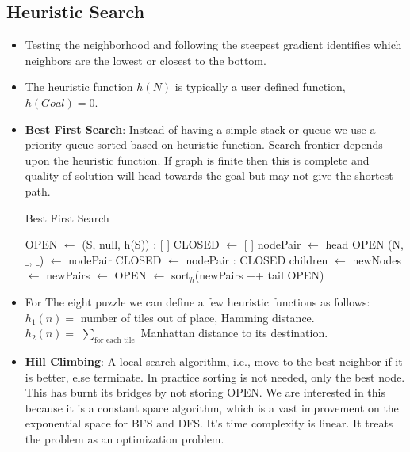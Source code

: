 \documentclass[a4paper]{article}
\begin{document}
\subsection{Heuristic Search}
\begin{itemize}
    \item Testing the neighborhood and following the steepest gradient identifies which neighbors are the lowest or closest to the bottom.
    \item The heuristic function $h(N)$ is typically a user defined function, $h(Goal)=0$.
    \item \textbf{Best First Search}: Instead of having a simple stack or queue we use a priority queue sorted based on heuristic function. Search frontier depends upon the heuristic function. If graph is finite then this is complete and quality of solution will head towards the goal but may not give the shortest path.
    \begin{algorithm}[H]
        \caption{Best First Search}\label{alg:AI-BestFS}
        \begin{algorithmic}[1]
            \State OPEN $\gets$ (S, null, h(S)) : [ ]
            \State CLOSED $\gets$ [ ]
                \State nodePair $\gets$ head OPEN
                \State (N, $\_$, $\_$) $\gets$ nodePair
                    \State \Return {}
                \EndIf
                \State CLOSED $\gets$ nodePair : CLOSED
                \State children $\gets$ 
                \State newNodes $\gets$ 
                \State newPairs $\gets$ 
                \State OPEN $\gets$ sort$_h$(newPairs ++ tail OPEN)
            \EndWhile
            \State \Return [ ]
        \end{algorithmic}
    \end{algorithm}
    \item For The eight puzzle we can define a few heuristic functions as follows:\\
    $h_1(n)=$ number of tiles out of place, Hamming distance.\\
    $h_2(n)=$ $\sum_{\text{for each tile}}$ Manhattan distance to its destination.
    \item \textbf{Hill Climbing}: A local search algorithm, i.e., move to the best neighbor if it is better, else terminate. In practice sorting is not needed, only the best node. This has burnt its bridges by not storing OPEN. We are interested in this because it is a constant space algorithm, which is a vast improvement on the exponential space for BFS and DFS. It's time complexity is linear. It treats the problem as an optimization problem.

\end{itemize}
\end{document}
